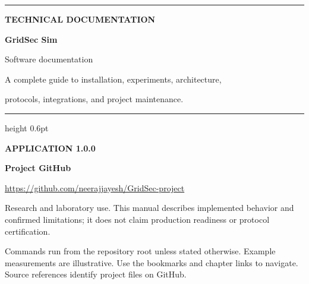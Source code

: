 \documentclass[10pt,a4paper,oneside]{report}
\begin{document}
\begin{titlepage}
\color{navy}
\vspace*{16mm}
{\color{teal}\rule{16mm}{1.5mm}}\par
\vspace{7mm}
{\color{teal}\bfseries\small TECHNICAL DOCUMENTATION}\par
\vspace{13mm}
{\fontsize{44}{50}\selectfont\bfseries GridSec Sim}\par
\vspace{4mm}
{\fontsize{23}{28}\selectfont Software documentation}\par
\vspace{13mm}
{\large\color{muted}A complete guide to installation, experiments, architecture,\par protocols, integrations, and project maintenance.}\par
\vspace{13mm}
{\color{teal}\hrule height 0.6pt}
\vspace{6mm}
{\color{teal}\bfseries APPLICATION 1.0.0}\par
\vspace{4mm}
{\bfseries Project GitHub}\par
\url{https://github.com/neerajjayesh/GridSec-project}
\par\vfill
\noindent{}\par
\vspace{15mm}
{\small\color{muted}Research and laboratory use. This manual describes implemented behavior and confirmed limitations; it does not claim production readiness or protocol certification.}\par
\vspace*{7mm}
\end{titlepage}
\setcounter{page}{2}
\label{contents}
\tableofcontents
\vspace{8pt}
{\small Commands run from the repository root unless stated otherwise. Example measurements are illustrative. Use the bookmarks and chapter links to navigate. Source references identify project files on GitHub.}
\end{document}
